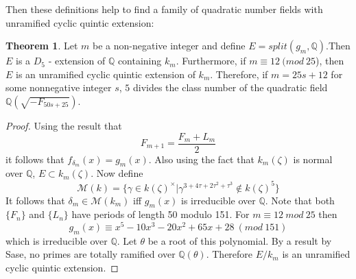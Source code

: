 \documentclass[12pt]{extarticle}
\newcommand{\Q}{\mathbb{Q}}
\newcommand{\<}{\langle}
\renewcommand{\>}{\rangle}
\theoremstyle{definition}
\newtheorem{theorem}{Theorem}
\begin{document}
Then these definitions help to find a family of quadratic number fields with unramified cyclic quintic extension:
\begin{theorem}
    Let $m$ be a non-negative integer and define $E = split(g_m,\Q)$.Then $E$ is a $D_5$ - extension
of $\Q$ containing $k_m$. Furthermore, if $m \equiv 12 \:(mod\:25$), then $E$ is an unramified cyclic quintic extension of $k_m$. Therefore, if $m = 25s + 12$ for some nonnegative integer $s$, $5$ divides the class number of the quadratic field $\Q(\sqrt{-F_{50s+25}})$.
\end{theorem}
\begin{proof}
Using the result that \begin{equation}
    F_{m+1}= \frac{F_m + L_m}{2}
\end{equation}
it follows that $f_{\delta_m}(x) = g_m(x)$. Also using the fact that $k_m(\zeta)$ is normal over $\Q$, $E\subset k_m(\zeta)$. Now define \begin{equation}
    \mathcal{M}(k)=\{\gamma \in k(\zeta)^{\times}|\gamma^{3+4\tau+2\tau^{2}+\tau^3}\notin k(\zeta)^5\}
\end{equation}
It follows that $\delta_m \in \mathcal{M}(k_m)$ iff $g_m(x)$ is irreducible over $\Q$. Note that both $\{F_n\}$ and $\{L_n\}$ have periods of length 50 modulo 151. For $m\equiv12 \: mod \: 25$ then \begin{equation}
    g_m(x) \equiv x^5 - 10x^3 - 20x^2 + 65x + 28\:(mod \:151)
\end{equation} which is irreducible over $\Q$. Let $\theta$ be a root of this polynomial. By a result by Sase, no primes are totally ramified over $\Q(\theta)$. Therefore $E/k_m$ is an unramified cyclic quintic extension. 
\end{proof}
\end{document}
